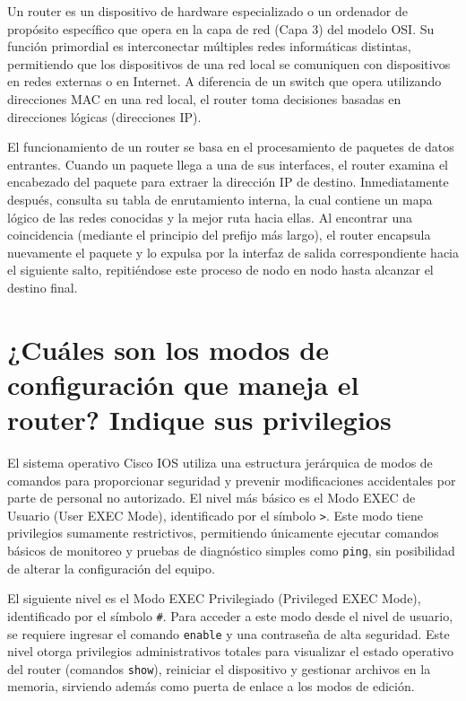 \documentclass[a4paper,12pt]{article}
\begin{document}
Un router es un dispositivo de hardware especializado o un ordenador de propósito específico que opera en la capa de red (Capa 3) del modelo OSI. Su función primordial es interconectar múltiples redes informáticas distintas, permitiendo que los dispositivos de una red local se comuniquen con dispositivos en redes externas o en Internet. A diferencia de un switch que opera utilizando direcciones MAC en una red local, el router toma decisiones basadas en direcciones lógicas (direcciones IP).

El funcionamiento de un router se basa en el procesamiento de paquetes de datos entrantes. Cuando un paquete llega a una de sus interfaces, el router examina el encabezado del paquete para extraer la dirección IP de destino. Inmediatamente después, consulta su tabla de enrutamiento interna, la cual contiene un mapa lógico de las redes conocidas y la mejor ruta hacia ellas. Al encontrar una coincidencia (mediante el principio del prefijo más largo), el router encapsula nuevamente el paquete y lo expulsa por la interfaz de salida correspondiente hacia el siguiente salto, repitiéndose este proceso de nodo en nodo hasta alcanzar el destino final.

\section{¿Cuáles son los modos de configuración que maneja el router? Indique sus privilegios}

El sistema operativo Cisco IOS utiliza una estructura jerárquica de modos de comandos para proporcionar seguridad y prevenir modificaciones accidentales por parte de personal no autorizado. El nivel más básico es el Modo EXEC de Usuario (User EXEC Mode), identificado por el símbolo \texttt{>}. Este modo tiene privilegios sumamente restrictivos, permitiendo únicamente ejecutar comandos básicos de monitoreo y pruebas de diagnóstico simples como \texttt{ping}, sin posibilidad de alterar la configuración del equipo.

El siguiente nivel es el Modo EXEC Privilegiado (Privileged EXEC Mode), identificado por el símbolo \texttt{\#}. Para acceder a este modo desde el nivel de usuario, se requiere ingresar el comando \texttt{enable} y una contraseña de alta seguridad. Este nivel otorga privilegios administrativos totales para visualizar el estado operativo del router (comandos \texttt{show}), reiniciar el dispositivo y gestionar archivos en la memoria, sirviendo además como puerta de enlace a los modos de edición.
\end{document}
